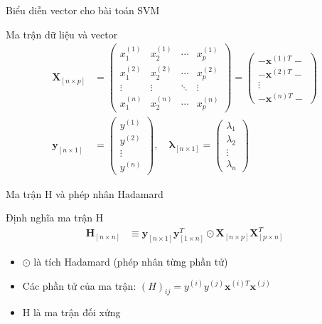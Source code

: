 \documentclass[serif, aspectratio=169]{beamer}
\begin{document}
	\begin{frame}{Biểu diễn vector cho bài toán SVM}
		\begin{block}{Ma trận dữ liệu và vector}
			\begin{align*}
				\mathbf{X}_{[n \times p]} &= 
				\begin{pmatrix}
					x^{(1)}_1 & x^{(1)}_2 & \cdots & x^{(1)}_p \\
					x^{(2)}_1 & x^{(2)}_2 & \cdots & x^{(2)}_p \\
					\vdots & \vdots & \ddots & \vdots \\
					x^{(n)}_1 & x^{(n)}_2 & \cdots & x^{(n)}_p
				\end{pmatrix}
				=
				\begin{pmatrix}
					- \mathbf{x}^{(1)T} - \\
					- \mathbf{x}^{(2)T} - \\
					\vdots \\
					- \mathbf{x}^{(n)T} -
				\end{pmatrix} \\
				\mathbf{y}_{[n \times 1]} &= 
				\begin{pmatrix}
					y^{(1)} \\
					y^{(2)} \\
					\vdots \\
					y^{(n)}
				\end{pmatrix},
				\quad
				\bm{\lambda}_{[n \times 1]} = 
				\begin{pmatrix}
					\lambda_1 \\
					\lambda_2 \\
					\vdots \\
					\lambda_n
				\end{pmatrix}
			\end{align*}
		\end{block}
	\end{frame}
	
	\begin{frame}{Ma trận H và phép nhân Hadamard}
		\begin{block}{Định nghĩa ma trận H}
			\begin{align*}
				\mathbf{H}_{[n \times n]} &\equiv \mathbf{y}_{[n \times 1]} \mathbf{y}^T_{[1 \times n]} \odot \mathbf{X}_{[n \times p]} \mathbf{X}^T_{[p \times n]}
			\end{align*}
			\begin{itemize}
				\item $\odot$ là tích Hadamard (phép nhân từng phần tử)
				\item Các phần tử của ma trận: $(H)_{ij} = y^{(i)}y^{(j)}\mathbf{x}^{(i)T}\mathbf{x}^{(j)}$
				\item H là ma trận đối xứng
			\end{itemize}
		\end{block}
	\end{frame}
	
\end{document}
